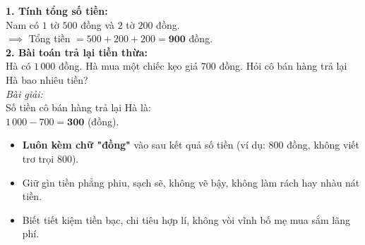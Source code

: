 \documentclass[10pt,a4paper]{article}
\begin{document}
\vspace{-1.5mm}
\noindent
\begin{minipage}[t]{0.49\textwidth}\vspace{0pt}
\begin{tcolorbox}[
  enhanced,
  colback=green!4!white,
  colframe=green!60!black,
  arc=2mm, boxrule=0.8pt,
  left=2mm, right=2mm, top=1.8mm, bottom=1.8mm,
  title={\footnotesize\bfseries\color{white}\faCheckCircle\ 4. Ví dụ thực hành mua bán}
]
{\footnotesize
\textbf{1. Tính tổng số tiền:}\\
Nam có $1$ tờ $500$ đồng và $2$ tờ $200$ đồng.\\
$\implies$ Tổng tiền $= 500 + 200 + 200 = \mathbf{900}$ đồng.\\
\textbf{2. Bài toán trả lại tiền thừa:}\\
Hà có $1\,000$ đồng. Hà mua một chiếc kẹo giá $700$ đồng. Hỏi cô bán hàng trả lại Hà bao nhiêu tiền?\\
\textit{Bài giải:}\\
Số tiền cô bán hàng trả lại Hà là:\\
$1\,000 - 700 = \mathbf{300}$ (đồng).
}
\end{tcolorbox}
\end{minipage}
\hfill
\begin{minipage}[t]{0.49\textwidth}\vspace{0pt}
\begin{tcolorbox}[
  enhanced,
  colback=rose!4!white,
  colframe=rose!70!black,
  arc=2mm, boxrule=0.8pt,
  left=2mm, right=2mm, top=1.8mm, bottom=1.8mm,
  title={\footnotesize\bfseries\color{white}\faExclamationTriangle\ 5. Lời dặn dò thực tế}
]
{\footnotesize
\begin{itemize}\setlength{\itemsep}{1.5pt}\setlength{\leftskip}{-2.5mm}
  \item \textbf{Luôn kèm chữ "đồng"} vào sau kết quả số tiền (ví dụ: $800$ đồng, không viết trơ trọi $800$).
  \item Giữ gìn tiền phẳng phiu, sạch sẽ, không vẽ bậy, không làm rách hay nhàu nát tiền.
  \item Biết tiết kiệm tiền bạc, chi tiêu hợp lí, không vòi vĩnh bố mẹ mua sắm lãng phí.
\end{itemize}
}
\end{tcolorbox}
\end{minipage}
\end{document}
